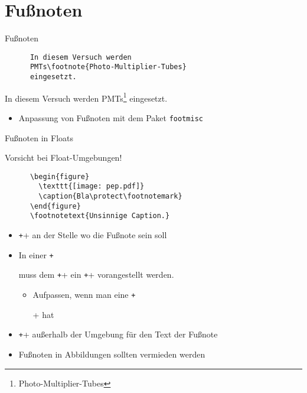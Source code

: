 \section{Fußnoten}

\begin{frame}[fragile]{Fußnoten}
  \begin{CodeExample}{0.5}
    \begin{verbatim}
      In diesem Versuch werden
      PMTs\footnote{Photo-Multiplier-Tubes}
      eingesetzt.
    \end{verbatim}
    \CodeResult
      In diesem Versuch werden
      PMTs\footnote{\rmfamily Photo-Multiplier-Tubes}
      eingesetzt.
    \vspace{4cm}
  \end{CodeExample}
  \begin{itemize}
    \item Anpassung von Fußnoten mit dem Paket \texttt{footmisc}
  \end{itemize}
\end{frame}

\begin{frame}[fragile]{Fußnoten in Floats}
  \begin{alertblock}{Vorsicht bei Float-Umgebungen!}
    \begin{verbatim}
      \begin{figure}
        \texttt{[image: pep.pdf]}
        \caption{Bla\protect\footnotemark}
      \end{figure}
      \footnotetext{Unsinnige Caption.}
    \end{verbatim}
  \end{alertblock}
  \vspace{-1pt}
  \begin{itemize}
    \item \texttt+\footnotemark+ an der Stelle wo die Fußnote sein soll
    \item In einer \texttt+\caption+ muss dem \texttt+\footnotemark+ ein \texttt+\protect+ vorangestellt werden.
      \begin{itemize}
        \item Aufpassen, wenn man eine \texttt+\listoffigures+ hat
      \end{itemize}
    \item \texttt++ außerhalb der Umgebung für den Text der Fußnote
    \item Fußnoten in Abbildungen sollten vermieden werden
  \end{itemize}
\end{frame}
